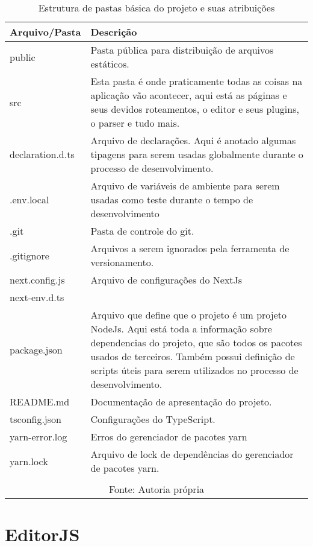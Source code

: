 \begin{table}[H]
    \centering
    \caption{Estrutura de pastas básica do projeto e suas atribuições}
    \label{tbl:pastas-projeto}
    \renewcommand{\arraystretch}{1.5}
    \begin{tabular}{p{3.2000cm} p{12.8000cm}}
        \hline
        \textbf{Arquivo/Pasta} & \textbf{Descrição} \\
        \hline
        public & Pasta pública para distribuição de arquivos estáticos. \\
		src & Esta pasta é onde praticamente todas as coisas na aplicação vão acontecer,
            aqui está as páginas e seus devidos roteamentos, o editor e seus plugins,
            o parser e tudo mais.
         \\
		declaration.d.ts & Arquivo de declarações. Aqui é anotado algumas tipagens para serem usadas
            globalmente durante o processo de desenvolvimento.
         \\
		.env.local & Arquivo de variáveis de ambiente para serem usadas como teste durante                o tempo de desenvolvimento \\
		.git & Pasta de controle do git. \\
		.gitignore & Arquivos a serem ignorados pela ferramenta de versionamento. \\
		next.config.js & Arquivo de configurações do NextJs \\
		next-env.d.ts &  \\
		package.json & Arquivo que define que o projeto é um projeto NodeJs. Aqui está toda a informação sobre dependencias
            do projeto, que são todos os pacotes usados de terceiros. Também possui definição
            de scripts úteis para serem utilizados no processo de desenvolvimento.
         \\
		README.md & Documentação de apresentação do projeto. \\
		tsconfig.json & Configurações do TypeScript. \\
		yarn-error.log & Erros do gerenciador de pacotes yarn \\
		yarn.lock & Arquivo de lock de dependências do gerenciador de pacotes yarn. \\
        \hline
        \\\multicolumn{2}{c}{\fontsize{10pt}{12pt}Fonte: Autoria própria}
    \end{tabular}
\end{table}

\section{EditorJS}

